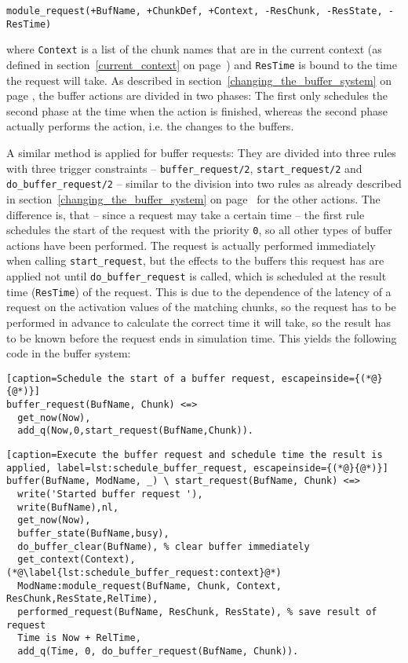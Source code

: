 \begin{lstlisting}
module_request(+BufName, +ChunkDef, +Context, -ResChunk, -ResState, -ResTime) 
\end{lstlisting}

where \lstinline|Context| is a list of the chunk names that are in the current context (as defined in section~\ref{current_context} on page~\pageref{current_context}) and \lstinline|ResTime| is bound to the time the request will take. As described in section~\ref{changing_the_buffer_system} on page \pageref{changing_the_buffer_system}, the buffer actions are divided in two phases: The first only schedules the second phase at the time when the action is finished, whereas the second phase actually performs the action, i.e. the changes to the buffers.

A similar method is applied for buffer requests: They are divided into three rules with three trigger constraints -- \lstinline|buffer_request/2|, \lstinline|start_request/2| and \lstinline|do_buffer_request/2| -- similar to the division into two rules as already described in section~\ref{changing_the_buffer_system} on page~\pageref{changing_the_buffer_system} for the other actions. The difference is, that -- since a request may take a certain time -- the first rule schedules the start of the request with the priority \lstinline|0|, so all other types of buffer actions have been performed. The request is actually performed immediately when calling \lstinline|start_request|, but the effects to the buffers this request has are applied not until \lstinline|do_buffer_request| is called, which is scheduled at the result time (\lstinline|ResTime|) of the request. This is due to the dependence of the latency of a request on the activation values of the matching chunks, so the request has to be performed in advance to calculate the correct time it will take, so the result has to be known before the request ends in simulation time. This yields the following code in the buffer system:

\begin{lstlisting}[caption=Schedule the start of a buffer request, escapeinside={(*@}{@*)}]
buffer_request(BufName, Chunk) <=>
  get_now(Now),
  add_q(Now,0,start_request(BufName,Chunk)).
\end{lstlisting}

\begin{lstlisting}[caption=Execute the buffer request and schedule time the result is applied, label=lst:schedule_buffer_request, escapeinside={(*@}{@*)}]
buffer(BufName, ModName, _) \ start_request(BufName, Chunk) <=> 
  write('Started buffer request '),
  write(BufName),nl,
  get_now(Now),
  buffer_state(BufName,busy),
  do_buffer_clear(BufName), % clear buffer immediately
  get_context(Context), (*@\label{lst:schedule_buffer_request:context}@*)
  ModName:module_request(BufName, Chunk, Context, ResChunk,ResState,RelTime),
  performed_request(BufName, ResChunk, ResState), % save result of request
  Time is Now + RelTime, 
  add_q(Time, 0, do_buffer_request(BufName, Chunk)).
\end{lstlisting}

